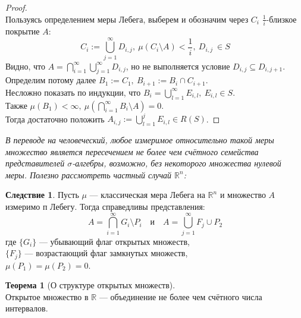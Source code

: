 \documentclass[11pt,a4paper]{report}
\def\Real{\mathbb{R}}
\theoremstyle{definition}
\theoremstyle{definition}
\newtheorem{theorem}{Теорема}[section]
\newtheorem{corollary}{Следствие}[section]
\theoremstyle{definition}
\begin{document}
	\begin{proof}$  $\\
		Пользуясь определением меры Лебега, выберем и обозначим через $ C_{i} $ $ \frac{1}{i} $-близкое покрытие $ A $: 
		\[ C_{i} := \bigcup\limits_{j=1}^{\infty}{D_{i, j}},\ \mu(C_{i} \setminus A) < \frac{1}{i},\ D_{i, j}\ \in S \]
		Видно, что $ A = \bigcap\limits_{i=1}^{\infty}{\bigcup\limits_{j=1}^{\infty}{D_{i, j}}} $, но не выполняется условие $ D_{i, j} \subseteq D_{i, j+1} $.\\
		Определим потому далее $ B_{1} := C_{1},\ B_{i+1} := B_{i} \cap C_{i+1} $.\\ 
		Несложно показать по индукции, что $ B_{i} = \bigcup\limits_{l=1}^{\infty}{E_{i, l}},\ E_{i, l} \in S $.\\
		Также $ \mu(B_{1}) < \infty,\ \mu\left (\bigcap\limits_{i=1}^{\infty}{B_{i} \setminus A}\right ) = 0 $.\\
		Тогда достаточно положить $ A_{i, j} := \bigcup\limits_{l=1}^{j}{E_{i, l}} \in R(S) $.
	\end{proof}
	\textit{В переводе на человеческий, любое измеримое относительно такой меры множество является пересечением не более чем счётного семейства представителей $ \sigma $-алгебры, возможно, без некоторого множества нулевой меры. Полезно рассмотреть частный случай $ \Real^{n} $:}
	\begin{corollary}
		Пусть $ \mu $ — классическая мера Лебега на $ \Real^{n} $ и множество $ A $ измеримо п Лебегу. Тогда справедливы представления:
		\[
			A = \bigcap\limits_{i=1}^{\infty}{G_{i}\setminus P_{i}}\quad \mbox{и} \quad A = \bigcup\limits_{j=1}^{\infty}{F_{j} \cup P_{2}}
		\]
		где $ \{G_{i}\} $ — убывающий флаг открытых множеств,\\ 
		$ \{F_{j}\} $ — возрастающий флаг замкнутых множеств,\\
		 $ \mu(P_{1}) = \mu(P_{2}) = 0 $. 
	\end{corollary}
	\begin{theorem}[О структуре открытых множеств]$  $\\
		Открытое множество в $ \Real $ — объединение не более чем счётного числа интервалов.
	\end{theorem}
\end{document}
